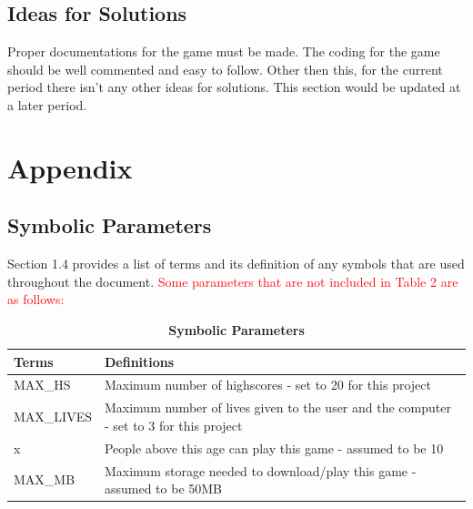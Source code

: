 \documentclass[12pt,letterpaper]{article}
\begin{document}
\subsection{Ideas for Solutions}
Proper documentations for the game must be made. The coding for the game should be well commented and easy to follow. Other then this, for the current period there isn’t any other ideas for solutions. This section would be updated at a later period. 
\section{Appendix}
\subsection{Symbolic Parameters}
Section 1.4 provides a list of terms and its definition of any symbols that are used throughout the document. \textcolor{red}{Some parameters that are not included in Table 2 are as follows: }
\begin{table}[H]
\caption{\bf Symbolic Parameters}
\begin{tabular}{|p{3cm}|p{10cm}|}
\hline
\textbf{Terms}    & \textbf{Definitions}                                                                                                                                                                                                                                                                                                                                                                                                                                \\\hline
MAX_HS		&	Maximum number of highscores - set to 20 for this project	\\\hline
MAX_LIVES		&	Maximum number of lives given to the user and the computer - set to 3 for this project	\\\hline
x 			&	People above this age can play this game - assumed to be 10	\\\hline
MAX_MB 		&	Maximum storage needed to download/play this game - assumed to be 50MB 	\\\hline
\end{tabular}
\end{table}
\end{document}
